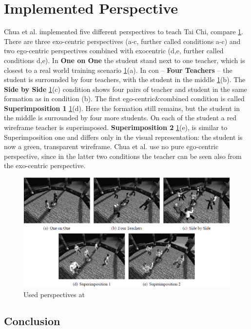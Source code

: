 \section{Implemented Perspective}
Chua et al. \cite{chua} implemented five different perspectives to teach Tai Chi, compare \ref{fig:taichiperspectives}. There are three exo-centric perspectives (a-c, further called conditions a-c) and two ego-centric perspectives combined with exocentric (d,e, further called conditions d,e). In \textbf{One on One} the student stand next to one teacher, which is closest to a real world training scenario \ref{fig:taichiperspectives}(a). In con \--- \textbf{Four Teachers} \--- the student is surrounded by four teachers, with the student in the middle \ref{fig:taichiperspectives}(b). The \textbf{Side by Side} \ref{fig:taichiperspectives}(c) condition shows four pairs of teacher and student in the same formation as in condition (b). The first ego-centric\&combined condition is called \textbf{Superimposition 1} \ref{fig:taichiperspectives}(d). Here the formation still remains, but the student in the middle is surrounded by four more students. On each of the student a red wireframe teacher is superimposed. \textbf{Superimposition 2} \ref{fig:taichiperspectives}(e), is similar to Superimposition one and differs only in the visual representation: the student is now a green, transparent wireframe. Chua et al. use no pure ego-centric perspective, since in the latter two conditions the teacher can be seen also from the exo-centric perspective.
\begin{figure}
	\centering
	\includegraphics[width=1.0\textwidth]{img/taichi_perspectives.png}
	\caption{Used perspectives at \cite{Chua}}
	\label{fig:taichiperspectives}
\end{figure}
\subsection{Conclusion}

